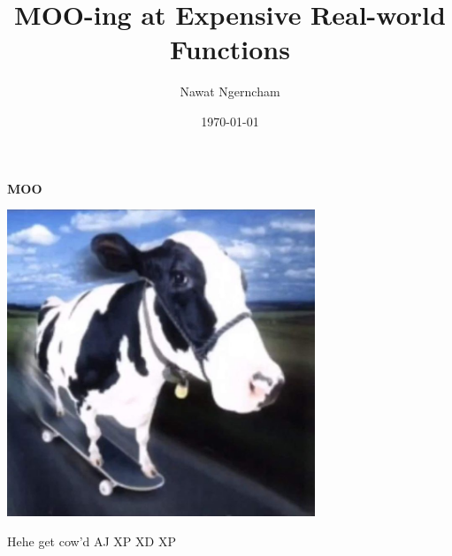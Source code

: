 \documentclass{article}
\title{MOO-ing at Expensive Real-world Functions}
\author{Nawat Ngerncham}
\date{\today}
\begin{document}
\maketitle







\newpage

\vspace*{\fill}
\centering
\Huge{\textbf{MOO}}

\vspace{5mm}

\includegraphics[width=0.69\textwidth]{../images/get-cowd.png}

\vspace{5mm}

\small{Hehe get cow'd AJ XP XD XP}
\vspace*{\fill}
\end{document}

